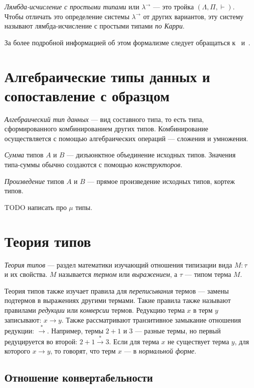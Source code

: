 \begin{definition}
    \emph{Лямбда-исчисление с простыми типами} или $\lambda^{\to}$ — это тройка
    $ (\Lambda , \Pi , \vdash) $.
    Чтобы отличать это определение системы $\lambda^{\to}$ от других вариантов,
    эту систему называют лямбда-исчисление с простыми типами \emph{по Карри}.
\end{definition}
За более подробной информацией об этом формализме следует
обращаться к~\cite{ChurchSTLC} и~\cite{Sorensen}.

\section{Алгебраические типы данных и сопоставление с образцом}

\emph{Алгебраический тип данных} — вид составного типа, то есть типа,
сформированного комбинированием других типов.
Комбинирование осуществляется с помощью алгебраических операций — сложения и умножения.

\emph{Сумма} типов $A$ и $B$ — дизъюнктное объединение исходных типов.
Значения типа-суммы обычно создаются с помощью \emph{конструкторов}.

\emph{Произведение} типов $A$ и $B$ — прямое произведение исходных типов,
кортеж типов.

TODO написать про $\mu$ типы.
\section{Теория типов}

\emph{Теория типов} — раздел математики изучающий отношения типизации вида
$ M \colon \tau $ и их свойства. $M$ называется \emph{термом} или \emph{выражением},
а $\tau$ — типом терма $M$.

Теория типов также изучает правила для \emph{переписывания} термов — замены
подтермов в выражениях другими термами.
Такие правила также называют правилами \emph{редукции} или \emph{конверсии} термов.
Редукцию терма $x$ в терм $y$ записывают: $x \to y$.
Также рассматривают транзитивное замыкание отношения редукции: $ \xrightarrow{*} $.
Например, термы $2 + 1$ и $3$ — разные термы, но первый редуцируется во второй:
$2 + 1 \xrightarrow{*} 3$.
Если для терма $x$ не существует терма $y$, для которого $x \to y$,
то говорят, что терм $x$ — в \emph{нормальной форме}.

\subsection{Отношение конвертабельности}

